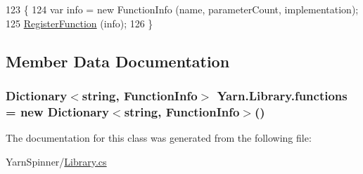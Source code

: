 \begin{DoxyCode}
123                                                                                                \{
124             var info = \textcolor{keyword}{new} FunctionInfo (name, parameterCount, implementation);
125             \hyperlink{a00103_a001ab29d21fe7db10fc9c250914287f9}{RegisterFunction} (info);
126         \}
\end{DoxyCode}


\subsection{Member Data Documentation}
\hypertarget{a00103_a2fcc78a63963be5320cf09783b66fab6}{
\subsubsection[{functions}]{\setlength{\rightskip}{0pt plus 5cm}Dictionary$<$string, {\bf Function\-Info}$>$ Yarn.\-Library.\-functions = new Dictionary$<$string, {\bf Function\-Info}$>$()\hspace{0.3cm}{\ttfamily [private]}}}\label{a00103_a2fcc78a63963be5320cf09783b66fab6}


The documentation for this class was generated from the following file\-:\begin{DoxyCompactItemize}
\item 
Yarn\-Spinner/\hyperlink{a00267}{Library.\-cs}\end{DoxyCompactItemize}
